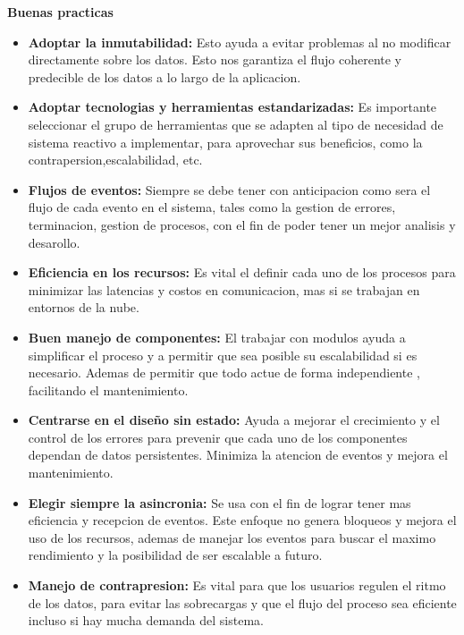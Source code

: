 \documentclass[12pt]{article}
\begin{document}
\textbf{Buenas practicas} 
\begin{itemize}
    \item\textbf{Adoptar la inmutabilidad:} Esto ayuda a evitar problemas al no modificar directamente sobre los datos. Esto nos garantiza el flujo coherente y predecible de los datos a lo largo de la aplicacion. 
    
    \item\textbf{Adoptar tecnologias y herramientas estandarizadas: } Es importante seleccionar el grupo de herramientas que se adapten al tipo de necesidad de sistema reactivo a implementar, para aprovechar sus beneficios, como la contrapersion,escalabilidad, etc.

     \item\textbf{Flujos de eventos: } Siempre se debe tener con anticipacion como sera el flujo de cada evento en el sistema, tales como la gestion de errores, terminacion, gestion de procesos, con el fin de poder tener un mejor analisis y desarollo.

     \item\textbf{Eficiencia en los recursos: } Es vital el definir cada uno de los procesos para minimizar las latencias y costos en comunicacion, mas si se trabajan en entornos de la nube.

     \item\textbf{Buen manejo de componentes: } El trabajar con modulos ayuda a simplificar el proceso y a permitir que sea posible su escalabilidad si es necesario. Ademas de permitir que todo actue de forma independiente , facilitando el mantenimiento.

     \item\textbf{Centrarse en el diseño sin estado: } Ayuda a mejorar el crecimiento y el control de los errores para prevenir que cada uno de los componentes dependan de datos persistentes. Minimiza la atencion de eventos y mejora el mantenimiento.

    \item\textbf{Elegir siempre la asincronia: } Se usa con el fin de lograr tener mas eficiencia y recepcion de eventos. Este enfoque no genera bloqueos y mejora el uso de los recursos, ademas de manejar los eventos para buscar el maximo rendimiento y la posibilidad de ser escalable a futuro.

    \item\textbf{Manejo de contrapresion: } Es vital para que los usuarios regulen el ritmo de los datos, para evitar las sobrecargas y que el flujo del proceso sea eficiente incluso si hay mucha demanda del sistema.
\end{itemize}
\end{document}
